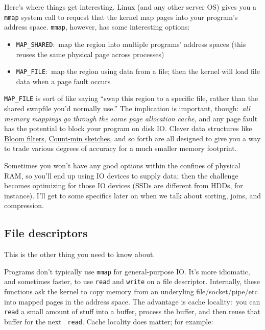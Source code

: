 \documentclass{article}
\newcommand{\lnk}[2]{\href{#1}{\textcolor[rgb]{1.0,0.0,0.0}{#2}}}
\begin{document}
  Here's where things get interesting. Linux (and any other server OS) gives you
  a {\tt mmap} system call to request that the kernel map pages into your
  program's address space. {\tt mmap}, however, has some interesting options:

  \begin{itemize}
    \item \verb|MAP_SHARED|:~map the region into multiple programs' address
          spaces (this reuses the same physical page across processes)
    \item \verb|MAP_FILE|:~map the region using data from a file; then the
          kernel will load file data when a page fault occurs
  \end{itemize}

  \verb|MAP_FILE| is sort of like saying ``swap this region to a specific file,
  rather than the shared swapfile you'd normally use.'' The implication is
  important, though:~{\it all memory mappings go through the same page
  allocation cache,} and any page fault has the potential to block your program
  on disk IO. Clever data structures like
  \lnk{https://en.wikipedia.org/wiki/Bloom_filter}{Bloom filters},
  \lnk{https://en.wikipedia.org/wiki/Count%
  sketches}, and so forth are all designed to give you a way to trade various
  degrees of accuracy for a much smaller memory footprint.

  Sometimes you won't have any good options within the confines of physical RAM,
  so you'll end up using IO devices to supply data; then the challenge becomes
  optimizing for those IO devices (SSDs are different from HDDs, for instance).
  I'll get to some specifics later on when we talk about sorting, joins, and
  compression.

  \subsection{File descriptors}
  This is the other thing you need to know about.

  Programs don't typically use {\tt mmap} for general-purpose IO. It's more
  idiomatic, and sometimes faster, to use {\tt read} and {\tt write} on a file
  descriptor. Internally, these functions ask the kernel to copy memory from an
  underyling file/socket/pipe/etc into mapped pages in the address space. The
  advantage is cache locality:~you can {\tt read} a small amount of stuff into a
  buffer, process the buffer, and then reuse that buffer for the next {\tt
  read}. Cache locality does matter; for example:
\end{document}
